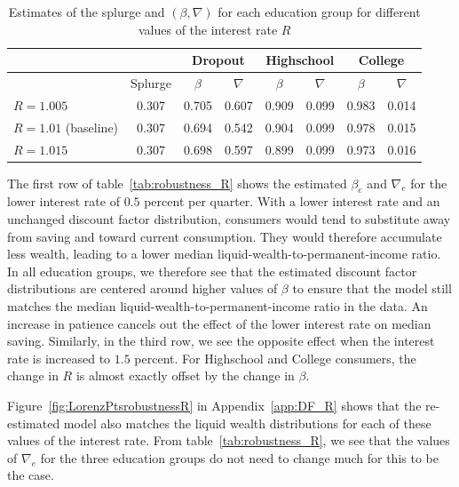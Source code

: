 \documentclass[\econtexRoot/HAFiscal]{subfiles}
\begin{document}
\begin{table}[t]
  \begin{center}
    \begin{tabular}{lc|cccccc} 
      \toprule
      & & \multicolumn{2}{c}{Dropout} & \multicolumn{2}{c}{Highschool} & \multicolumn{2}{c}{College} \\ \midrule 
      & Splurge & $\beta$ & $\nabla$ & $\beta$ & $\nabla$ & $\beta$ & $\nabla$ \\ \midrule 
      $R = 1.005$ & 0.307 & 0.705 & 0.607 & 0.909 & 0.099 & 0.983 & 0.014 \\
      $R = 1.01$ (baseline) & 0.307 & 0.694 & 0.542 & 0.904 & 0.099 & 0.978 & 0.015 \\ 
      $R = 1.015$ & 0.307 & 0.698 & 0.597 & 0.899 & 0.099 & 0.973 & 0.016 
      \\ \bottomrule 
    \end{tabular}
    \caption{Estimates of the splurge and $(\beta,\nabla)$ for each education group for different values of the interest rate $R$}
    \notinsubfile{\label{tab:robustness_R}}
  \end{center}
\end{table}

The first row of table~\ref{tab:robustness_R} shows the estimated $\beta_e$ and $\nabla_e$ for the lower interest rate of $0.5$ percent per quarter. With a lower interest rate and an unchanged discount factor distribution, consumers would tend to substitute away from saving and toward current consumption. They would therefore accumulate less wealth, leading to a lower median liquid-wealth-to-permanent-income ratio. In all education groups, we therefore see that the estimated discount factor distributions are centered around higher values of $\beta$ to ensure that the model still matches the median liquid-wealth-to-permanent-income ratio in the data. An increase in patience cancels out the effect of the lower interest rate on median saving. Similarly, in the third row, we see the opposite effect when the interest rate is increased to $1.5$ percent. For Highschool and College consumers, the change in $R$ is almost exactly offset by the change in $\beta$.  

Figure~\ref{fig:LorenzPtsrobustnessR} in Appendix~\ref{app:DF_R} shows that the re-estimated model also matches the liquid wealth distributions for each of these values of the interest rate. From table~\ref{tab:robustness_R}, we see that the values of $\nabla_e$ for the three education groups do not need to change much for this to be the case. 
\end{document}

